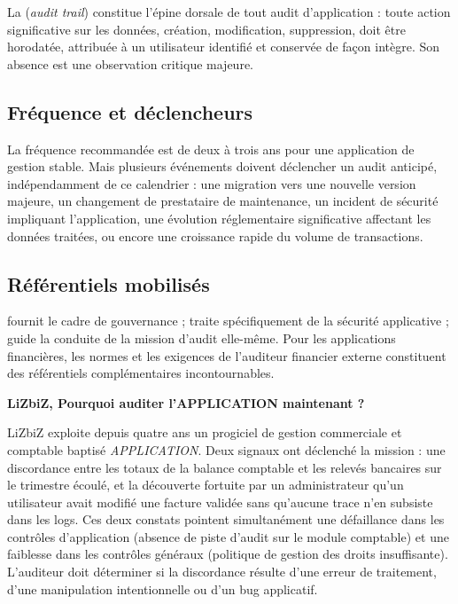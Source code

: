 La  (\textit{audit trail}) constitue l'épine dorsale de tout audit d'application : toute action significative sur les données, création, modification, suppression, doit être horodatée, attribuée à un utilisateur identifié et conservée de façon intègre. Son absence est une observation critique majeure.

\subsection{Fréquence et déclencheurs}

La fréquence recommandée est de deux à trois ans pour une application de gestion stable. Mais plusieurs événements doivent déclencher un audit anticipé, indépendamment de ce calendrier : une migration vers une nouvelle version majeure, un changement de prestataire de maintenance, un incident de sécurité impliquant l'application, une évolution réglementaire significative affectant les données traitées, ou encore une croissance rapide du volume de transactions.

\subsection{Référentiels mobilisés}

 fournit le cadre de gouvernance ;  traite spécifiquement de la sécurité applicative ;  guide la conduite de la mission d'audit elle-même. Pour les applications financières, les normes  et les exigences de l'auditeur financier externe constituent des référentiels complémentaires incontournables.

\begin{boxlizbiz}
\textbf{LiZbiZ, Pourquoi auditer l'APPLICATION maintenant ?}

LiZbiZ exploite depuis quatre ans un progiciel de gestion commerciale et comptable baptisé \textit{APPLICATION}. Deux signaux ont déclenché la mission : une discordance entre les totaux de la balance comptable et les relevés bancaires sur le trimestre écoulé, et la découverte fortuite par un administrateur qu'un utilisateur avait modifié une facture validée sans qu'aucune trace n'en subsiste dans les logs. Ces deux constats pointent simultanément une défaillance dans les contrôles d'application (absence de piste d'audit sur le module comptable) et une faiblesse dans les contrôles généraux (politique de gestion des droits insuffisante). L'auditeur doit déterminer si la discordance résulte d'une erreur de traitement, d'une manipulation intentionnelle ou d'un bug applicatif.
\end{boxlizbiz}


